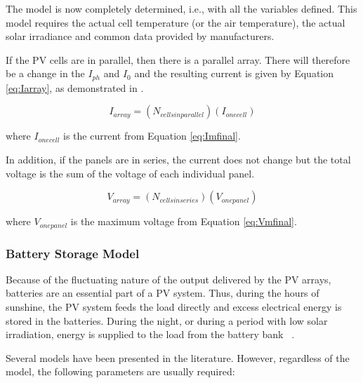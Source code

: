 The model is now completely determined, i.e., with all the variables defined. This model requires the actual cell temperature (or the air temperature), the actual solar irradiance and common data provided by manufacturers.

If the PV cells are in parallel, then there is a parallel array. There will therefore be a change in the $ I_{ph} $ and $ I_{0} $ and the resulting current is given by Equation \ref{eq:Iarray}, as demonstrated in \cite{Saloux}.

\begin{equation}
\label{eq:Iarray}
I_{array} = (N_{cells in parallel})(I_{one cell})
\end{equation}

\noindent where $ I_{one cell} $ is the current from Equation \ref{eq:Imfinal}.

In addition, if the panels are in series, the current does not change but the total voltage is the sum of the voltage of each individual panel.

\begin{equation}
\label{eq:Varray}
V_{array} = (N_{cells in series})(V_{one panel})
\end{equation}

\noindent where $ V_{one panel} $ is the maximum voltage from Equation \ref{eq:Vmfinal}.

\subsubsection{Battery Storage Model}

Because of the fluctuating nature of the output delivered by the PV arrays, batteries are an essential part of a PV system. Thus, during the hours of sunshine, the PV system feeds the load directly and excess electrical energy is stored in the batteries. During the night, or during a period with low solar irradiation, energy is supplied to the load from the battery bank ~\cite{Mellit}.
  
Several models have been presented in the literature. However, regardless of the model, the following parameters are usually required\cite{Mellit}: 

